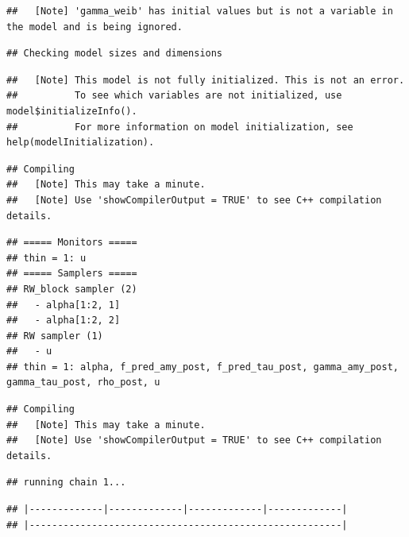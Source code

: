 \documentclass[
]{article}
\begin{document}
\begin{verbatim}
##   [Note] 'gamma_weib' has initial values but is not a variable in the model and is being ignored.
\end{verbatim}

\begin{verbatim}
## Checking model sizes and dimensions
\end{verbatim}

\begin{verbatim}
##   [Note] This model is not fully initialized. This is not an error.
##          To see which variables are not initialized, use model$initializeInfo().
##          For more information on model initialization, see help(modelInitialization).
\end{verbatim}

\begin{verbatim}
## Compiling
##   [Note] This may take a minute.
##   [Note] Use 'showCompilerOutput = TRUE' to see C++ compilation details.
\end{verbatim}

\begin{verbatim}
## ===== Monitors =====
## thin = 1: u
## ===== Samplers =====
## RW_block sampler (2)
##   - alpha[1:2, 1]
##   - alpha[1:2, 2] 
## RW sampler (1)
##   - u
## thin = 1: alpha, f_pred_amy_post, f_pred_tau_post, gamma_amy_post, gamma_tau_post, rho_post, u
\end{verbatim}

\begin{verbatim}
## Compiling
##   [Note] This may take a minute.
##   [Note] Use 'showCompilerOutput = TRUE' to see C++ compilation details.
\end{verbatim}

\begin{verbatim}
## running chain 1...
\end{verbatim}

\begin{verbatim}
## |-------------|-------------|-------------|-------------|
## |-------------------------------------------------------|
\end{verbatim}
\end{document}
